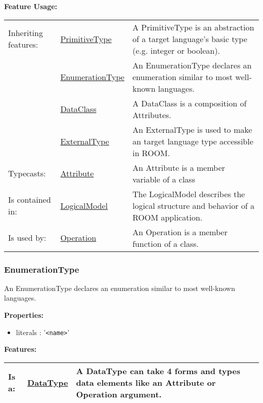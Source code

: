 		
	\begingroup
	\textbf{Feature Usage:}
	\renewcommand{\arraystretch}{1.8} %
	\begin{longtable}{l|l p{}}
		\hline
	Inheriting features: & \tabitem \hyperlink{ref:PrimitiveType}{PrimitiveType}  & A PrimitiveType is an abstraction of a target language's basic type (e.g. integer or boolean).\\
	& \tabitem \hyperlink{ref:EnumerationType}{EnumerationType}  & An EnumerationType declares an enumeration similar to most well-known languages. \\
	& \tabitem \hyperlink{ref:DataClass}{DataClass}  & A DataClass is a composition of Attributes. \\
	& \tabitem \hyperlink{ref:ExternalType}{ExternalType}  & An ExternalType is used to make an target language type accessible in ROOM. \\
	\hline
	Typecasts: & \tabitem \hyperlink{ref:Attribute}{Attribute}  & An Attribute is a member variable of a class\\
	\hline
	Is contained in: & \tabitem \hyperlink{ref:LogicalModel}{LogicalModel}  & The LogicalModel describes the logical structure and behavior of a ROOM application.\\
	\hline
	Is used by: & \tabitem \hyperlink{ref:Operation}{Operation}  & An Operation is a member function of a class.\\
	\hline
	\end{longtable}
	\endgroup
		
	
	\vspace{\baselineskip}
	\vspace{\baselineskip}
	\vspace{\baselineskip}
	
\subsubsection{EnumerationType}
	\hypertarget{ref:EnumerationType}{}
	An EnumerationType declares an enumeration similar to most well-known languages.
		
		
	\textbf{Properties:}
	\begin{itemize}
	\item literals : '\verb|<name>|'
	\end{itemize}
		
	\begingroup
	\textbf{Features:}
	\renewcommand{\arraystretch}{1.8} %
	\begin{longtable}{l|l p{}}
		\hline
	Is a: & \tabitem \hyperlink{ref:DataType}{DataType}  & A DataType can take 4 forms and types data elements like an Attribute or Operation argument.\\
	\hline
	\end{longtable}
	\endgroup
		

